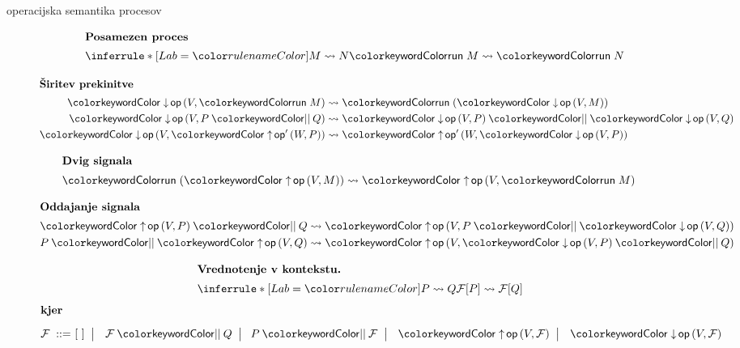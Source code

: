 \documentclass{beamer}
\theoremstyle{definition} %
\theoremstyle{plain} %
\begin{document}
	\begin{frame}{\lae{} operacijska semantika procesov}
		\begin{figure}[tp]
			\parbox{\textwidth}{
				\centering
				\tiny
				\begin{minipage}[t]{0.4\textwidth}
					\centering
					\begin{align*}
					\shortintertext{\textbf{Posamezen proces}}
					\coopinfer{}{
						M \reduces N
					}{
						\tmrun M \reduces \tmrun N
					}
					\end{align*}
				\end{minipage}
				\qquad
				\begin{minipage}[t]{0.4\textwidth}
					\centering
					\begin{align*}
					\shortintertext{\textbf{Širitev prekinitve}}
					\tmopin{op}{V}{\tmrun M} &\reduces \tmrun {(\tmopin{op}{V}{M})}
					\\
					\tmopin{op}{V}{\tmpar P Q} &\reduces \tmpar {\tmopin{op}{V}{P}} {\tmopin{op}{V}{Q}}
					\\
					\tmopin{op}{V}{\tmopout{op'}{W}{P}} &\reduces \tmopout{op'}{W}{\tmopin{op}{V}{P}}
					\end{align*}
				\end{minipage}
			
				
				
				
				\begin{minipage}[t]{0.4\textwidth}
					\centering
					\begin{align*}
					\shortintertext{\textbf{Dvig signala}}
					\tmrun {(\tmopout{op}{V}{M})}  &\reduces \tmopout{op}{V}{\tmrun M}
					\end{align*}
				\end{minipage}
				\qquad
				\begin{minipage}[t]{0.4\textwidth}
					\centering
					\begin{align*}
					\shortintertext{\textbf{Oddajanje signala}}
					\tmpar{\tmopout{op}{V}{P}}{Q} &\reduces \tmopout{op}{V}{\tmpar{P}{\tmopin{op}{V}{Q}}}
					\\
					\tmpar{P}{\tmopout{op}{V}{Q}} &\reduces \tmopout{op}{V}{\tmpar{\tmopin{op}{V}{P}}{Q}}
					\end{align*}
				\end{minipage}
				
		
				\begin{align*}
				\shortintertext{\quad\textbf{Vrednotenje v kontekstu.}}
				\quad
				\coopinfer{}{
					P \reduces Q
				}{
					\F[P] \reduces \F[Q]
				}
				\end{align*}
				\vspace{-8ex}
				\begin{align*}
				\shortintertext{\textbf{kjer}\vspace{1ex}}
				\text{$\F$}
				\bnfis& [~]
				\bnfor \tmpar \F Q \bnfor\! \tmpar P \F
				\bnfor \tmopout{op}{V}{\F}
				\bnfor \tmopin{op}{V}{\F}
				\end{align*}
			} 
		\end{figure}
	\end{frame}
\end{document}
